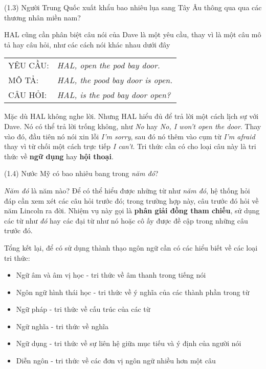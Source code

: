 \vspace{2mm}
\noindent
(1.3) Người Trung Quốc xuất khẩu bao nhiêu lụa sang Tây Âu thông qua qua các thương nhân miền nam?
\vspace{2mm}

HAL cũng cần phân biệt câu nói của Dave là một yêu cầu, thay vì là một câu mô tả hay câu hỏi, như các cách nói khác nhau dưới đây

\begin{tabular}{ l l }
	 YÊU CẦU: & \textit{HAL, open the pod bay door.} \\
	 MÔ TẢ: & \textit{HAL, the pood bay door is open.} \\
	 CÂU HỎI: & \textit{HAL, is the pod bay door open?}
	\end{tabular}
 \label{table:1}

Mặc dù HAL không nghe lời. Nhưng HAL hiểu đủ để trả lời một cách lịch sự với Dave. Nó có thể trả lời trống không, như \textit{No} hay \textit{No, I won't open the door}. Thay vào đó, đầu tiên nó nói xin lỗi \textit{I'm sorry}, sau đó nó thêm vào cụm từ \textit{I'm afraid} thay vì từ chối một cách trực tiếp \textit{I can't}. Tri thức cần có cho loại câu này là tri thức về \textbf{ngữ dụng} hay \textbf{hội thoại}.

\vspace{2mm}
\noindent
(1.4) Nước Mỹ có bao nhiêu bang trong \textit{năm đó}?
\vspace{2mm}

\textit{Năm đó} là năm nào? Để có thể hiểu được những từ như \textit{năm đó}, hệ thống hỏi đáp cần xem xét các câu hỏi trước đó; trong trường hợp này, câu trước đó hỏi về năm Lincoln ra đời. Nhiệm vụ này gọi là \textbf{phân giải đồng tham chiếu}, sử dụng các từ như \textit{đó} hay các đại từ như nó hoặc cô ấy được đề cập trong những câu trước đó.

Tổng kết lại, để có sử dụng thành thạo ngôn ngữ cần có các hiểu biết về các loại tri thức:

\begin{itemize}[noitemsep]
  \item Ngữ âm và âm vị học - tri thức về âm thanh trong tiếng nói
  \item Ngôn ngữ hình thái học - tri thức về ý nghĩa của các thành phần trong từ
  \item Ngữ pháp - tri thức về cấu trúc của các từ
  \item Ngữ nghĩa - tri thức về nghĩa
  \item Ngữ dụng - tri thức về sự liên hệ giữa mục tiếu và ý định của người nói
  \item Diễn ngôn - tri thức về các đơn vị ngôn ngữ nhiều hơn một câu
\end{itemize}

